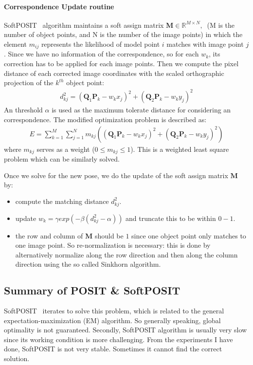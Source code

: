 \documentclass[a4paper]{article}
\begin{document}
\paragraph{Correspondence Update routine}
SoftPOSIT~\cite{softposit} algorithm maintains a soft assign matrix $\mathbf{M} \in \mathbb{R}^{M\times N},\ $ (M is the number of object points, and N is the number of the image points) in which the element $m_{ij}$ represents the likelihood of model point $i$ matches with image point $j$. Since we have no information of the correspondence, so for each $w_k$, its correction has to be applied for each image points. Then we compute the pixel distance of each corrected image coordinates with the scaled orthographic projection of the $k^{th}$ object point:
\begin{align*}
d_{kj}^2=(\mathbf{Q}_1\mathbf{P}_k-w_k x_j)^2 + (\mathbf{Q}_2\mathbf{P}_k-w_k y_j)^2
\end{align*}
An threshold $\alpha$ is used as the maximum tolerate distance for considering an correspondence. The modified optimization problem is described as:
\begin{align*}
E=\sum_{k=1}^{M}\sum_{j=1}^{N}m_{kj}\left(
\left(
\mathbf{Q}_1\mathbf{P}_k-w_k x_j
\right)^2+
\left(
\mathbf{Q}_2\mathbf{P}_k-w_k y_j
\right)^2
\right)
\end{align*}
where $m_{kj}$ serves as a weight ($0 \leq m_{kj} \leq 1$). This is a weighted least square problem which can be similarly solved. 

Once we solve for the new pose, we do the update of the soft assign matrix $\mathbf{M}$ by:
\begin{itemize}
	\item compute the matching distance $d_{kj}^2$.
	\item update $w_k=\gamma exp(-\beta(d_{kj}^2-\alpha))$ and truncate this to be within $0-1$.
	\item the row and column of $\mathbf{M}$ should be $1$ since one object point only matches to one image point. So re-normalization is necessary: this is done by alternatively normalize along the row direction and then along the column direction using the so called Sinkhorn algorithm.
\end{itemize}

\subsection{Summary of POSIT \& SoftPOSIT}
SoftPOSIT~\cite{softposit} iterates to solve this problem, which is related to the general expectation-maximization (EM) algorithm. So generally speaking, global optimality is not guaranteed. Secondly, SoftPOSIT algorithm is usually very slow since its working condition is more challenging. From the experiments I have done, SoftPOSIT is not very stable. Sometimes it cannot find the correct solution.
\end{document}
